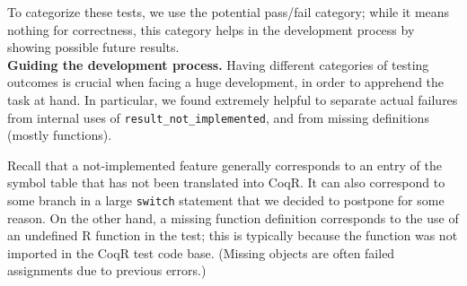 \documentclass[
    sigplan,
    10pt,
    review, %
    natbib=false %
 ]{acmart}
\newcommand\td[1]{\todo[color=green!20,size=\scriptsize]{#1}}
\newcommand\CoqR{CoqR}
\begin{document}
%
%
To categorize these tests,
we use the \textsf{potential pass/fail} category; while it means nothing for correctness, this category helps in the development process by showing possible future results.\\



\noindent\textbf{Guiding the development process.}
Having different categories of testing outcomes is crucial when facing a huge development, in order to apprehend the task at hand. In particular, we found extremely helpful to separate actual failures from internal uses of \texttt{result_not_implemented}, and from missing definitions (mostly functions).

Recall that a not-implemented feature generally corresponds to an entry of the symbol table that has not been translated into \CoqR{}. It can also correspond to some branch in a large \texttt{switch} statement that we decided to postpone for some reason. On the other hand, a missing function definition corresponds to the use of an undefined R function in the test; this is typically because the function was not imported in the \CoqR{} test code base. (Missing objects are often failed assignments due to previous errors.)
\end{document}
